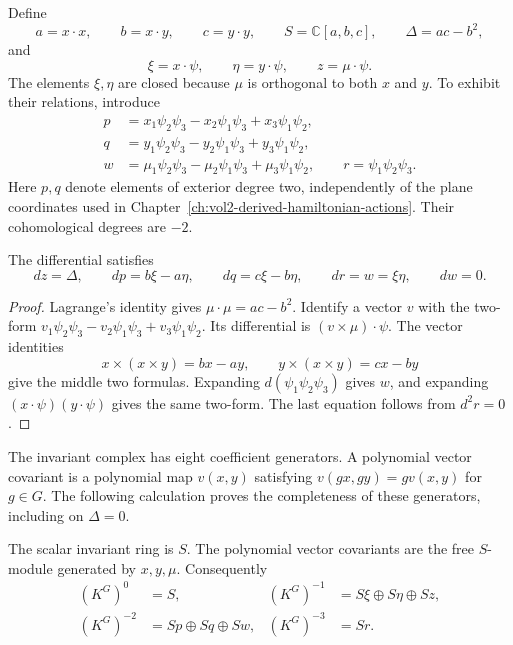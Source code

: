 Define
\[
 a=x\cdot x,\qquad b=x\cdot y,\qquad c=y\cdot y,
 \qquad S=\mathbb C[a,b,c],\qquad \Delta=ac-b^2,
\]
and
\[
 \xi=x\cdot\psi,\qquad \eta=y\cdot\psi,\qquad z=\mu\cdot\psi.
\]
The elements $\xi,\eta$ are closed because $\mu$ is orthogonal to both
$x$ and $y$. To exhibit their relations, introduce
\[
 \begin{aligned}
 p&=x_1\psi_2\psi_3-x_2\psi_1\psi_3+x_3\psi_1\psi_2,\\
 q&=y_1\psi_2\psi_3-y_2\psi_1\psi_3+y_3\psi_1\psi_2,\\
 w&=\mu_1\psi_2\psi_3-\mu_2\psi_1\psi_3+\mu_3\psi_1\psi_2,
 \qquad r=\psi_1\psi_2\psi_3.
 \end{aligned}
\]
Here $p,q$ denote elements of exterior degree two, independently of the
plane coordinates used in Chapter~\ref{ch:vol2-derived-hamiltonian-actions}.
Their cohomological degrees are $-2$.

\begin{lemma}\label{lem:vol2-rank-two-primitives}
The differential satisfies
\begin{equation}\label{eq:vol2-rank-two-primitives}
 dz=\Delta,\qquad
 dp=b\xi-a\eta,\qquad dq=c\xi-b\eta,\qquad
 dr=w=\xi\eta,\qquad dw=0.
\end{equation}
\end{lemma}

\begin{proof}
Lagrange's identity gives $\mu\cdot\mu=ac-b^2$.
Identify a vector $v$ with the two-form
$v_1\psi_2\psi_3-v_2\psi_1\psi_3+v_3\psi_1\psi_2$.
Its differential is $(v\times\mu)\cdot\psi$.
The vector identities
\[
 x\times(x\times y)=bx-ay,\qquad
 y\times(x\times y)=cx-by
\]
give the middle two formulas. Expanding $d(\psi_1\psi_2\psi_3)$ gives
$w$, and expanding $(x\cdot\psi)(y\cdot\psi)$ gives the same two-form.
The last equation follows from $d^2r=0$.
\end{proof}

The invariant complex has eight coefficient generators. A polynomial
vector covariant is a polynomial map $v(x,y)$ satisfying
$v(gx,gy)=gv(x,y)$ for $g\in G$. The following calculation proves
the completeness of these generators, including on $\Delta=0$.

\begin{lemma}\label{lem:vol2-rank-two-covariants}
The scalar invariant ring is $S$. The polynomial vector covariants are
the free $S$-module generated by $x,y,\mu$. Consequently
\begin{equation}\label{eq:vol2-rank-two-components}
 \begin{aligned}
 (K^G)^0&=S,&
 (K^G)^{-1}&=S\xi\oplus S\eta\oplus Sz,\\
 (K^G)^{-2}&=Sp\oplus Sq\oplus Sw,&
 (K^G)^{-3}&=Sr.
 \end{aligned}
\end{equation}
\end{lemma}


